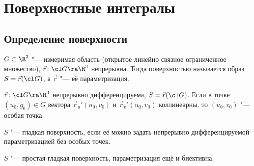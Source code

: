 \chapter{Поверхностные интегралы}

\section{Определение поверхности}

\begin{Def}
	$G \subset \R^2$ "--- измеримая область (открытое линейно связное ограниченное множество),
	$\vec r\colon \cl G \ra \R^3$ непрерывна.
	Тогда поверхностью называется образ $S = \vec r(\cl G)$, а $\vec r$ "--- её параметризация.
\end{Def}

\begin{Def}
	$\vec r\colon \cl G \ra \R^3$ непрерывно дифференцируема, $S = \vec r(\cl G)$.
	Если в точке $(u_0, g_0) \in G$ вектора $\vec r_u'(u_0, v_0)$ и $\vec r_v'(u_0, v_0)$ коллинеарны, то
	$(u_0, v_0)$ "--- особая точка.
\end{Def}

\begin{Def}
	$S$ "--- гладкая поверхность, если её можно задать непрерывно дифференцируемой параметризацией без особых точек.
\end{Def}

\begin{Def}
	$S$ "--- простая гладкая поверхность, параметризация ещё и биективна.
\end{Def}

